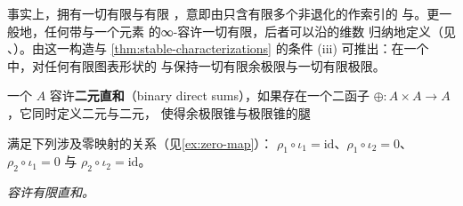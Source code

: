 \begin{remark}\label{rem:finite-limits-stable}
事实上，\trStable{}\trInfinityCategory{}拥有一切有限\trLimit{}与有限%
\trColimit{}，意即由只含有限多个非退化\trSimplex{}的\trSimplicialSet{}作索引的%
\trLimit{}与\trColimit{}。更一般地，任何带\trPullback{}与一个\trTerminal{}元素
的∞-\trCategory{}容许一切有限\trLimit{}，后者可以沿\trSimplicialSet{}的维数
归纳地定义（见 \cite[4.4.2.4]{bib78}、\cite[6.3.9]{bib112}）。由这一构造与
\cref{thm:stable-characterizations} 的条件 (iii) 可推出：在一个%
\trStable{}\trInfinityCategory{}中，对任何有限图表形状的\trLimit\trFunctor{}%
与\trColimit\trFunctor{}保持一切有限余极限与一切有限极限。
\end{remark}

\begin{definition}\label{def:binary-direct-sums}
一个\trPointed{}\trInfinityCategory{} $A$ 容许\textbf{二元直和}（binary
direct sums），如果存在一个二函子
$\oplus\colon A\times A\to A$，它同时定义二元\trProduct{}与二元\trCoproduct{}，
使得余极限锥与极限锥的腿
\begin{center}
\end{center}
满足下列涉及零映射的关系（见\cref{ex:zero-map}）：
$\rho_{1}\circ\iota_{1}=\mathrm{id}$、$\rho_{1}\circ\iota_{2}=0$、
$\rho_{2}\circ\iota_{1}=0$ 与 $\rho_{2}\circ\iota_{2}=\mathrm{id}$。
\end{definition}

\begin{lemma}\label{lem:stable-finite-direct-sums}
\emph{\trStable{}\trInfinityCategory{}容许有限直和。}
\end{lemma}

